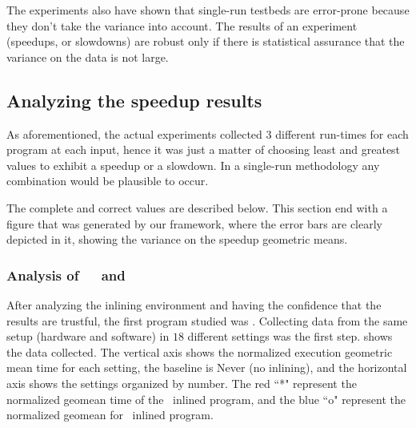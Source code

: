 The experiments also have shown that single-run testbeds are error-prone because they don't take the variance into account. The results of an experiment (speedups, or slowdowns) are robust only if there is statistical assurance that the variance on the data is not large.


\subsection{Analyzing the speedup results}

As aforementioned, the actual experiments collected $3$ different run-times for each program at each input, hence it was just a matter of choosing least and greatest values to exhibit a speedup or a slowdown. In a single-run methodology any combination would be plausible to occur.

The complete and correct values are described below. This section end with a figure that was generated by our framework, where the error bars are clearly depicted in it, showing the variance on the speedup geometric means.

\subsubsection{Analysis of\ \ \bzip\  and  \gzip}

After analyzing the inlining environment and having the confidence that the results are trustful, the first program studied was \bzip. 
Collecting data from the same setup (hardware and software) in $18$ different settings was the first step.  shows the data collected. The vertical axis shows the normalized execution geometric mean time for each setting, the baseline is Never (no inlining), and the horizontal axis shows the settings organized by number. The red ``*" represent the normalized geomean time of the \FDI\ inlined program, and the blue ``o" represent the normalized geomean for \llvm\ inlined program.


